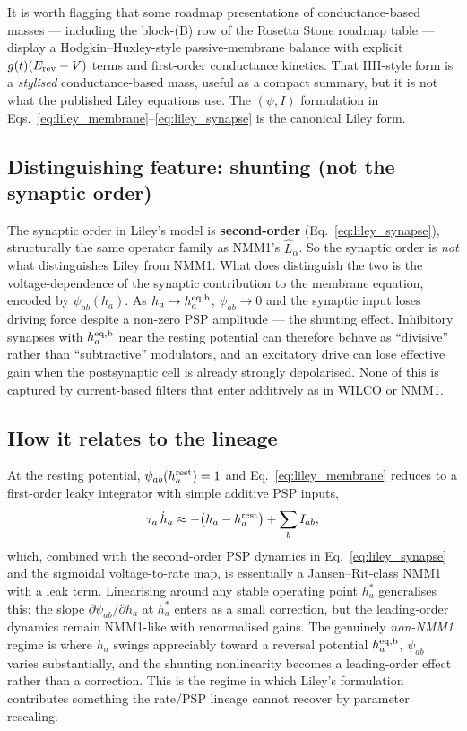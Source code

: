 \documentclass[11pt,a4paper]{article}
\begin{document}
It is worth flagging that some roadmap presentations of conductance-based masses --- including the block-(B) row of the Rosetta Stone roadmap table --- display a Hodgkin--Huxley-style passive-membrane balance with explicit $g(t)(E_{\rm rev}-V)$ terms and first-order conductance kinetics. That HH-style form is a \emph{stylised} conductance-based mass, useful as a compact summary, but it is not what the published Liley equations use. The $(\psi, I)$ formulation in Eqs.~\eqref{eq:liley_membrane}--\eqref{eq:liley_synapse} is the canonical Liley form.

\subsection{Distinguishing feature: shunting (not the synaptic order)}

The synaptic order in Liley's model is \textbf{second-order} (Eq.~\eqref{eq:liley_synapse}), structurally the same operator family as NMM1's $\hat L_\alpha$. So the synaptic order is \emph{not} what distinguishes Liley from NMM1. What does distinguish the two is the voltage-dependence of the synaptic contribution to the membrane equation, encoded by $\psi_{ab}(h_a)$. As $h_a \to h_a^{\rm eq,b}$, $\psi_{ab}\to 0$ and the synaptic input loses driving force despite a non-zero PSP amplitude --- the shunting effect. Inhibitory synapses with $h_a^{\rm eq,b}$ near the resting potential can therefore behave as ``divisive'' rather than ``subtractive'' modulators, and an excitatory drive can lose effective gain when the postsynaptic cell is already strongly depolarised. None of this is captured by current-based filters that enter additively as in WILCO or NMM1.

\subsection{How it relates to the lineage}

At the resting potential, $\psi_{ab}(h_a^{\rm rest}) = 1$ and Eq.~\eqref{eq:liley_membrane} reduces to a first-order leaky integrator with simple additive PSP inputs,
\begin{equation}
\tau_a\,\dot h_a \approx -\bigl(h_a - h_a^{\rm rest}\bigr) + \sum_b I_{ab},
\end{equation}
which, combined with the second-order PSP dynamics in Eq.~\eqref{eq:liley_synapse} and the sigmoidal voltage-to-rate map, is essentially a Jansen--Rit-class NMM1 with a leak term. Linearising around any stable operating point $h_a^*$ generalises this: the slope $\partial \psi_{ab}/\partial h_a$ at $h_a^*$ enters as a small correction, but the leading-order dynamics remain NMM1-like with renormalised gains. The genuinely \emph{non-NMM1} regime is where $h_a$ swings appreciably toward a reversal potential $h_a^{\rm eq,b}$, $\psi_{ab}$ varies substantially, and the shunting nonlinearity becomes a leading-order effect rather than a correction. This is the regime in which Liley's formulation contributes something the rate/PSP lineage cannot recover by parameter rescaling.
\end{document}
